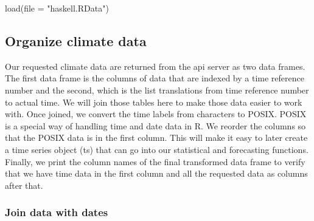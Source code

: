 \documentclass[
  paper=a4,
  ,captions=tableheading
]{scrartcl}
\newenvironment{Shaded}{\begin{snugshade}}{\end{snugshade}}
\newcommand{\AttributeTok}[1]{\textcolor[rgb]{0.77,0.63,0.00}{#1}}
\newcommand{\CommentTok}[1]{\textcolor[rgb]{0.56,0.35,0.01}{\textit{#1}}}
\newcommand{\DecValTok}[1]{\textcolor[rgb]{0.00,0.00,0.81}{#1}}
\newcommand{\FunctionTok}[1]{\textcolor[rgb]{0.00,0.00,0.00}{#1}}
\newcommand{\NormalTok}[1]{#1}
\newcommand{\OtherTok}[1]{\textcolor[rgb]{0.56,0.35,0.01}{#1}}
\newcommand{\SpecialCharTok}[1]{\textcolor[rgb]{0.00,0.00,0.00}{#1}}
\newcommand{\StringTok}[1]{\textcolor[rgb]{0.31,0.60,0.02}{#1}}
\begin{document}
\begin{Shaded}
\begin{Highlighting}[]
\FunctionTok{load}\NormalTok{(}\AttributeTok{file =} \StringTok{"haskell.RData"}\NormalTok{)}
\end{Highlighting}
\end{Shaded}

\hypertarget{organize-climate-data}{%
\subsection{Organize climate data}\label{organize-climate-data}}

Our requested climate data are returned from the api server as two data
frames. The first data frame is the columns of data that are indexed by
a time reference number and the second, which is the list translations
from time reference number to actual time. We will join those tables
here to make those data easier to work with. Once joined, we convert the
time labels from characters to POSIX. POSIX is a special way of handling
time and date data in R. We reorder the columns so that the POSIX data
is in the first column. This will make it easy to later create a time
series object (ts) that can go into our statistical and forecasting
functions. Finally, we print the column names of the final transformed
data frame to verify that we have time data in the first column and all
the requested data as columns after that.

\hypertarget{join-data-with-dates}{%
\subsubsection{Join data with dates}\label{join-data-with-dates}}

\begin{Shaded}
\end{Shaded}
\end{document}
